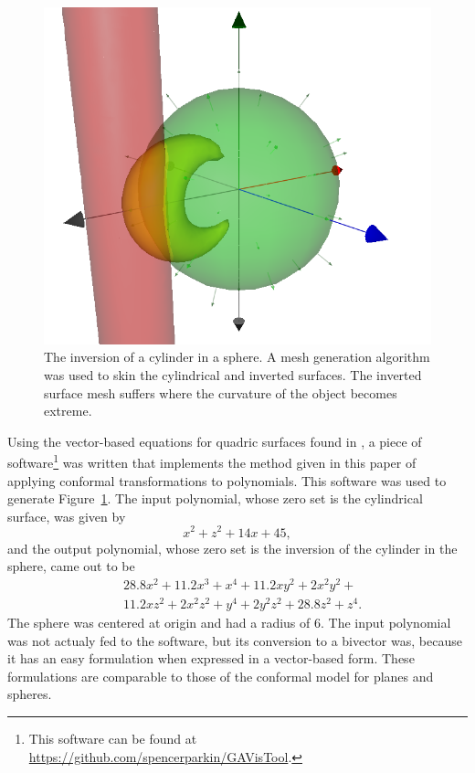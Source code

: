 \documentclass{birkjour}
\theoremstyle{definition}
\theoremstyle{remark}
\numberwithin{equation}{section}
\begin{document}
\begin{figure}
\includegraphics[scale=0.3]{InvertCylinderInSphere}
\caption{The inversion of a cylinder in a sphere.  A mesh generation algorithm was used to skin
the cylindrical and inverted surfaces.  The inverted surface mesh suffers where the curvature
of the object becomes extreme.}
\label{fig_invert_cylinder_in_sphere}
\end{figure}

Using the vector-based equations for quadric surfaces found in \cite{Miller87},
a piece of software\footnote{This software can be found at \url{https://github.com/spencerparkin/GAVisTool}.}
was written that implements the method given in this paper of
applying conformal transformations to polynomials.  This software was used
to generate Figure~\ref{fig_invert_cylinder_in_sphere}.  The input
polynomial, whose zero set is the cylindrical surface, was given by
\begin{equation*}
x^2 + z^2 + 14x + 45,
\end{equation*}
and the output polynomial, whose zero set is the inversion of the cylinder in the sphere,
came out to be
\begin{equation*}
\begin{split}
&28.8x^{2} + 11.2x^{3} + x^{4} + 11.2xy^{2} + 2x^{2}y^{2} + \\
&11.2xz^{2} + 2x^{2}z^{2} + y^{4} + 2y^{2}z^{2} + 28.8z^{2} + z^{4}.
\end{split}
\end{equation*}
The sphere was centered at origin and had a radius of 6.  The input polynomial
was not actualy fed to the software, but its conversion to a bivector was, because
it has an easy formulation when expressed in a vector-based form.  These formulations
are comparable to those of the conformal model for planes and spheres.
\end{document}
